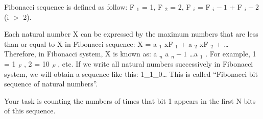 Fibonacci sequence is defined as follow: F   $_    1   $   = 1, F   $_    2   $   = 2, F   $_    i   $   = F   $_    i-1   $   + F   $_    i-2   $   (i $>$ 2).  

   Each natural number X can be expressed by the maximum numbers that are less than or equal to X in Fibonacci sequence: X = a   $_    1   $   xF   $_    1   $   + a   $_    2   $   xF   $_    2   $   + … Therefore, in Fibonacci system, X is known as: a   $_    n   $   a   $_    n-1   $   …a   $_    1   $   . For example, 1 = 1   $_    F   $   , 2 = 10   $_    F   $   , etc. If we write all natural numbers successively in Fibonacci system, we will obtain a sequence like this: 1\_1\_0… This is called “Fibonacci bit sequence of natural numbers”.  

   Your task is counting the numbers of times that bit 1 appears in the first N bits of this sequence.
